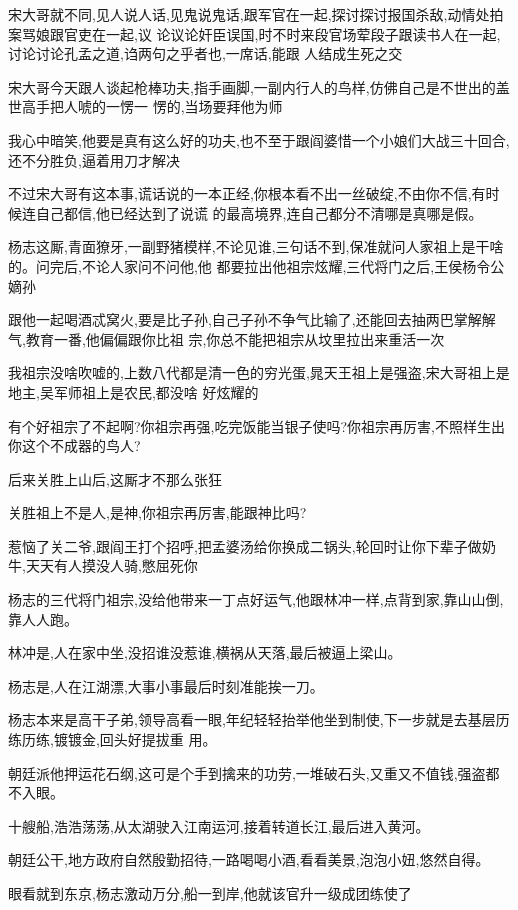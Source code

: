 ﻿\documentclass[12pt]{article}
\begin{document}
宋大哥就不同,见人说人话,见鬼说鬼话,跟军官在一起,探讨探讨报国杀敌,动情处拍案骂娘\dldots 跟官吏在一起,议
论议论奸臣误国,时不时来段官场荤段子\dldots 跟读书人在一起,讨论讨论孔孟之道,诌两句之乎者也,一席话,能跟
人结成生死之交

宋大哥今天跟人谈起枪棒功夫,指手画脚,一副内行人的鸟样,仿佛自己是不世出的盖世高手\dldots 把人唬的一愣一
愣的,当场要拜他为师

我心中暗笑,他要是真有这么好的功夫,也不至于跟阎婆惜一个小娘们大战三十回合,还不分胜负,逼着用刀才解决

不过宋大哥有这本事,谎话说的一本正经,你根本看不出一丝破绽,不由你不信,有时候连自己都信,他已经达到了说谎
的最高境界,连自己都分不清哪是真哪是假。

杨志这厮,青面獠牙,一副野猪模样,不论见谁,三句话不到,保准就问人家祖上是干啥的。问完后,不论人家问不问他,他
都要拉出他祖宗炫耀,三代将门之后,王侯杨令公嫡孙

跟他一起喝酒忒窝火,要是比子孙,自己子孙不争气比输了,还能回去抽两巴掌解解气,教育一番,他偏偏跟你比祖
宗,你总不能把祖宗从坟里拉出来重活一次\dldots

我祖宗没啥吹嘘的,上数八代都是清一色的穷光蛋,晁天王祖上是强盗,宋大哥祖上是地主,吴军师祖上是农民,都没啥
好炫耀的\dldots

有个好祖宗了不起啊?你祖宗再强,吃完饭能当银子使吗?你祖宗再厉害,不照样生出你这个不成器的鸟人?

后来关胜上山后,这厮才不那么张狂

关胜祖上不是人,是神,你祖宗再厉害,能跟神比吗?

惹恼了关二爷,跟阎王打个招呼,把孟婆汤给你换成二锅头,轮回时让你下辈子做奶牛,天天有人摸没人骑,憋屈死你

杨志的三代将门祖宗,没给他带来一丁点好运气,他跟林冲一样,点背到家,靠山山倒,靠人人跑。

林冲是,人在家中坐,没招谁没惹谁,横祸从天落,最后被逼上梁山。

杨志是,人在江湖漂,大事小事最后时刻准能挨一刀。

杨志本来是高干子弟,领导高看一眼,年纪轻轻抬举他坐到制使,下一步就是去基层历练历练,镀镀金,回头好提拔重
用。

朝廷派他押运花石纲,这可是个手到擒来的功劳,一堆破石头,又重又不值钱,强盗都不入眼。

十艘船,浩浩荡荡,从太湖驶入江南运河,接着转道长江,最后进入黄河。

朝廷公干,地方政府自然殷勤招待,一路喝喝小酒,看看美景,泡泡小妞,悠然自得。

眼看就到东京,杨志激动万分,船一到岸,他就该官升一级成团练使了
\end{document}

